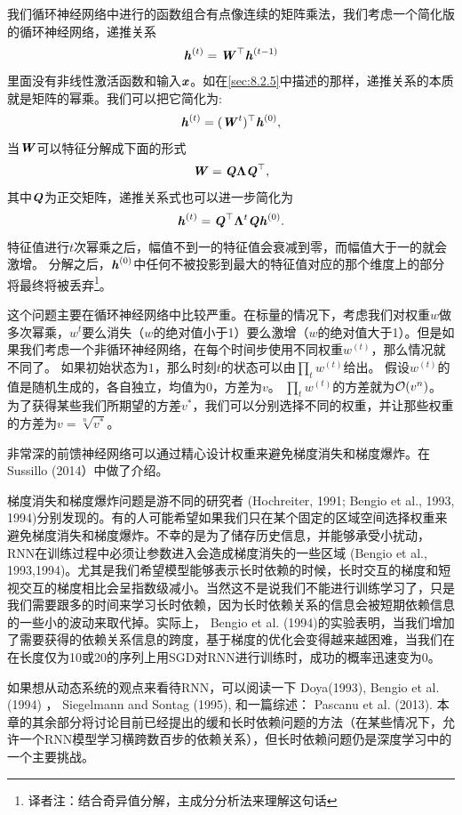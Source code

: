 我们循环神经网络中进行的函数组合有点像连续的矩阵乘法，我们考虑一个简化版的循环神经网络，递推关系
\begin{align}
 \boldsymbol{\mathit{h}}^{(t)} = \boldsymbol{\mathit{W}}^\top \boldsymbol{\mathit{h}}^{(t-1)}
\end{align}
里面没有非线性激活函数和输入$\boldsymbol{\mathit{x}}$。如在\ref{sec:8.2.5}中描述的那样，递推关系的本质就是矩阵的幂乘。我们可以把它简化为:
\begin{align}
 \boldsymbol{\mathit{h}}^{(t)} = (\boldsymbol{\mathit{W}}^t)^\top \boldsymbol{\mathit{h}}^{(0)},
\end{align}
当$\boldsymbol{\mathit{W}}$可以特征分解成下面的形式
\begin{align}
 \boldsymbol{\mathit{W}} = \boldsymbol{\mathit{Q}} \boldsymbol{\Lambda} \boldsymbol{\mathit{Q}}^\top,
\end{align}
其中$\boldsymbol{\mathit{Q}}$为正交矩阵，递推关系式也可以进一步简化为
\begin{align}
 \boldsymbol{\mathit{h}}^{(t)} = \boldsymbol{\mathit{Q}}^\top \boldsymbol{\Lambda}^t \boldsymbol{\mathit{Q}} \boldsymbol{\mathit{h}}^{(0)}.
\end{align}
特征值进行$t$次幂乘之后，幅值不到一的特征值会衰减到零，而幅值大于一的就会激增。
分解之后，$\boldsymbol{\mathit{h}}^{(0)}$中任何不被投影到最大的特征值对应的那个维度上的部分将最终将被丢弃\footnote{译者注：结合奇异值分解，主成分分析法来理解这句话}。

这个问题主要在循环神经网络中比较严重。在标量的情况下，考虑我们对权重$w$做多次幂乘，$w^t$要么消失（$w$的绝对值小于1）要么激增（$w$的绝对值大于1）。但是如果我们考虑一个非循环神经网络，在每个时间步使用不同权重$w^{(t)}$，那么情况就不同了。
如果初始状态为$1$，那么时刻$t$的状态可以由$\prod_t w^{(t)}$给出。
假设$w^{(t)}$的值是随机生成的，各自独立，均值为$0$，方差为$v$。
$\prod_t w^{(t)}$的方差就为$\mathcal{O}(v^n)$。
为了获得某些我们所期望的方差$v^*$，我们可以分别选择不同的权重，并让那些权重的方差为$v=\sqrt[n]{v^*}$。

非常深的前馈神经网络可以通过精心设计权重来避免梯度消失和梯度爆炸。在Sussillo (2014）中做了介绍。

梯度消失和梯度爆炸问题是游不同的研究者 (Hochreiter, 1991; Bengio et al., 1993, 1994)分别发现的。有的人可能希望如果我们只在某个固定的区域空间选择权重来避免梯度消失和梯度爆炸。不幸的是为了储存历史信息，并能够承受小扰动，RNN在训练过程中必须让参数进入会造成梯度消失的一些区域 (Bengio et al., 1993,1994)。尤其是我们希望模型能够表示长时依赖的时候，长时交互的梯度和短视交互的梯度相比会呈指数级减小。当然这不是说我们不能进行训练学习了，只是我们需要跟多的时间来学习长时依赖，因为长时依赖关系的信息会被短期依赖信息的一些小的波动来取代掉。实际上， Bengio et al. (1994)的实验表明，当我们增加了需要获得的依赖关系信息的跨度，基于梯度的优化会变得越来越困难，当我们在在长度仅为10或20的序列上用SGD对RNN进行训练时，成功的概率迅速变为0。

如果想从动态系统的观点来看待RNN，可以阅读一下 Doya(1993), Bengio et al. (1994) ， Siegelmann and Sontag (1995), 和一篇综述： Pascanu et al. (2013).
本章的其余部分将讨论目前已经提出的缓和长时依赖问题的方法（在某些情况下，允许一个RNN模型学习横跨数百步的依赖关系），但长时依赖问题仍是深度学习中的一个主要挑战。





